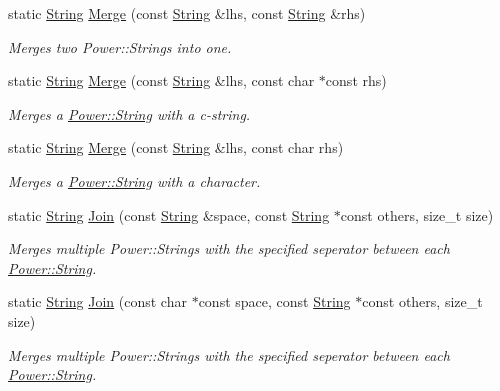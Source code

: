 \begin{DoxyCompactItemize}
static \hyperlink{class_power_1_1_string}{String} \hyperlink{class_power_1_1_string_a2ff1e27342ceff292fe081024a33f0d9}{Merge} (const \hyperlink{class_power_1_1_string}{String} \&lhs, const \hyperlink{class_power_1_1_string}{String} \&rhs)
\begin{DoxyCompactList}\small\item\em Merges two Power\+::\+Strings into one. \end{DoxyCompactList}\item 
static \hyperlink{class_power_1_1_string}{String} \hyperlink{class_power_1_1_string_a9514012041c69214d8e978f85721f669}{Merge} (const \hyperlink{class_power_1_1_string}{String} \&lhs, const char $\ast$const rhs)
\begin{DoxyCompactList}\small\item\em Merges a \hyperlink{class_power_1_1_string}{Power\+::\+String} with a c-\/string. \end{DoxyCompactList}\item 
static \hyperlink{class_power_1_1_string}{String} \hyperlink{class_power_1_1_string_afbd0ab7834831ad0a7806ad1c5941307}{Merge} (const \hyperlink{class_power_1_1_string}{String} \&lhs, const char rhs)
\begin{DoxyCompactList}\small\item\em Merges a \hyperlink{class_power_1_1_string}{Power\+::\+String} with a character. \end{DoxyCompactList}\item 
static \hyperlink{class_power_1_1_string}{String} \hyperlink{class_power_1_1_string_ac4197801cb69b5bc00714f1a5bb638a6}{Join} (const \hyperlink{class_power_1_1_string}{String} \&space, const \hyperlink{class_power_1_1_string}{String} $\ast$const others, size\+\_\+t size)
\begin{DoxyCompactList}\small\item\em Merges multiple Power\+::\+Strings with the specified seperator between each \hyperlink{class_power_1_1_string}{Power\+::\+String}. \end{DoxyCompactList}\item 
static \hyperlink{class_power_1_1_string}{String} \hyperlink{class_power_1_1_string_a76705ac5e044bef73714c8e04fabc8cc}{Join} (const char $\ast$const space, const \hyperlink{class_power_1_1_string}{String} $\ast$const others, size\+\_\+t size)
\begin{DoxyCompactList}\small\item\em Merges multiple Power\+::\+Strings with the specified seperator between each \hyperlink{class_power_1_1_string}{Power\+::\+String}. \end{DoxyCompactList}\item 

\end{DoxyCompactItemize}
